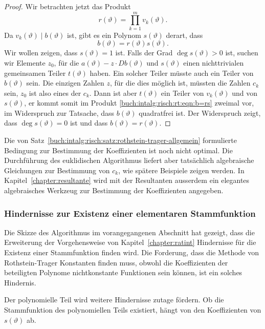 \begin{proof}
Wir betrachten jetzt das Produkt
\[
r(\vartheta) = \prod_{k=1}^m v_k(\vartheta).
\]
Da $v_k(\vartheta)\mid b(\vartheta)$ ist, gibt es ein Polynom $s(\vartheta)$
derart, dass
\begin{equation}
b(\vartheta) = r(\vartheta) s(\vartheta).
\label{buch:intalg:risch:rt:eqn:b=rs}
\end{equation}
Wir wollen zeigen, dass $s(\vartheta)=1$ ist.
Falls der Grad $\deg s(\vartheta)>0$ ist, suchen wir Elemente $z_0$, für
die 
$a(\vartheta) - z\cdot Db(\vartheta)$ und $s(\vartheta)$ einen nichttrivialen
gemeinsamen Teiler $t(\vartheta)$ haben.
Ein solcher Teiler müsste auch ein Teiler von $b(\vartheta)$ sein.
Die einzigen Zahlen $z$, für die dies möglich ist, müssten die Zahlen
$c_k$ sein, $z_0$ ist also eines der $c_k$.
Dann ist aber $t(\vartheta)$ ein Teiler von $v_k(\vartheta)$ und von
$s(\vartheta)$, er kommt somit im Produkt 
\eqref{buch:intalg:risch:rt:eqn:b=rs}
zweimal vor, im Widerspruch zur Tatsache, dass $b(\vartheta)$ quadratfrei
ist.
Der Widerspruch zeigt, dass $\deg s(\vartheta)=0$ ist und dass
$b(\vartheta)=r(\vartheta)$.
\end{proof}

Die von Satz~\ref{buch:intalg:risch:satz:rothstein-trager-allgemein}
formulierte Bedingung zur Bestimmung der Koeffizienten ist noch nicht
optimal.
Die Durchführung des euklidischen Algorithmus liefert aber tatsächlich
algebraische Gleichungen zur Bestimmung von $c_k$, wie spätere Beispiele
zeigen werden.
In Kapitel~\ref{chapter:resultante} wird mit der Resultanten ausserdem
ein elegantes algebraisches Werkzeug zur Bestimmung der Koeffizienten
angegeben.


%
%
\subsubsection{Hindernisse zur Existenz einer elementaren Stammfunktion}
Die Skizze des Algorithmus im vorangegangenen Abschnitt hat gezeigt,
dass die Erweiterung der Vorgehensweise von Kapitel~\ref{chapter:ratint}
Hindernisse für die Existenz einer Stammfunktion finden wird.
Die Forderung, dass die Methode von Rothstein-Trager Konstanten
finden muss, obwohl die Koeffizienten der beteiligten Polynome
nichtkonstante Funktionen sein können, ist ein solches Hindernis.

Der polynomielle Teil wird weitere Hindernisse zutage fördern.
Ob die Stammfunktion des polynomiellen Teils existiert, hängt von
den Koeffizienten von $s(\vartheta)$ ab.
